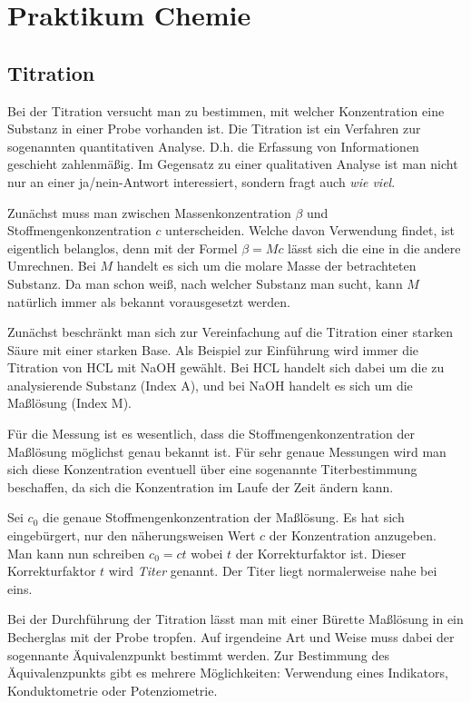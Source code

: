\documentclass[a4paper,11pt,fleqn,twocolumn]{article}
\begin{document}
\thispagestyle{empty}
\section*{Praktikum Chemie}
\subsection*{Titration}

Bei der Titration versucht man zu bestimmen, mit welcher Konzentration
eine Substanz in einer Probe vorhanden ist. Die Titration ist
ein Verfahren zur sogenannten quantitativen Analyse. D.h. die
Erfassung von Informationen geschieht zahlenmäßig. Im Gegensatz zu
einer qualitativen Analyse ist man nicht nur an einer ja/nein-Antwort
interessiert, sondern fragt auch \textit{wie viel}.

Zunächst muss man zwischen Massenkonzentration $\beta$ und
Stoffmengenkonzentration $c$ unterscheiden. Welche davon Verwendung
findet,
ist eigentlich belanglos, denn mit der Formel $\beta = Mc$ lässt
sich die eine in die andere Umrechnen. Bei $M$ handelt es sich
um die molare Masse der betrachteten Substanz. Da man schon weiß,
nach welcher Substanz man sucht, kann $M$ natürlich immer
als bekannt vorausgesetzt werden.

Zunächst beschränkt man sich zur Vereinfachung auf die Titration
einer starken Säure mit einer starken Base. Als Beispiel zur
Einführung wird immer die Titration von HCL mit NaOH gewählt.
Bei HCL handelt sich dabei um die zu analysierende Substanz (Index A),
und bei NaOH handelt es sich um die Maßlösung (Index M).

Für die Messung ist es wesentlich, dass die Stoffmengenkonzentration
der Maßlösung möglichst genau bekannt ist. Für sehr genaue Messungen
wird man sich diese Konzentration eventuell über eine sogenannte
Titerbestimmung beschaffen, da sich die Konzentration im Laufe
der Zeit ändern kann.

Sei $c_0$ die genaue Stoffmengenkonzentration der Maßlösung. Es hat sich
eingebürgert, nur den näherungsweisen Wert $c$ der Konzentration
anzugeben. Man kann nun schreiben $c_0=ct$ wobei $t$ der
Korrekturfaktor ist. Dieser Korrekturfaktor $t$ wird \emph{Titer}
genannt. Der Titer liegt normalerweise nahe bei eins.

Bei der Durchführung der Titration lässt man mit einer Bürette Maßlösung
in ein Becherglas mit der Probe tropfen. Auf irgendeine Art und
Weise muss dabei der sogennante Äquivalenzpunkt bestimmt werden.
Zur Bestimmung des Äquivalenzpunkts gibt es mehrere Möglichkeiten:
Verwendung eines Indikators, Konduktometrie oder Potenziometrie.
\end{document}
